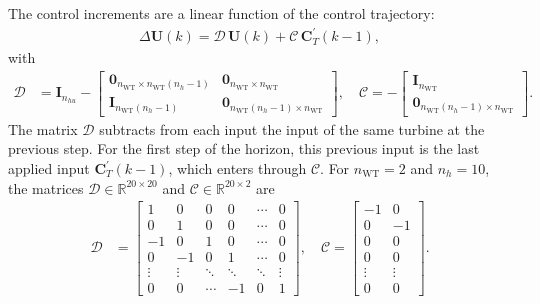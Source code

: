The control increments are a linear function of the control trajectory:
\begin{align*}
    \Delta \bm{U}(k) = \bm{\mathcal{D}}\, \bm{U}(k) + \bm{\mathcal{C}}\, \bm{C}_T^\prime(k-1),
\end{align*}
with
\begin{align*}
    \bm{\mathcal{D}} &= \bm{I}_{n_{hu}} -
    \begin{bmatrix}
        \bm{0}_{n_{\text{WT}} \times n_{\text{WT}}(n_h-1)} & \bm{0}_{n_{\text{WT}} \times n_{\text{WT}}} \\
        \bm{I}_{n_{\text{WT}}(n_h-1)} & \bm{0}_{n_{\text{WT}}(n_h-1) \times n_{\text{WT}}}
    \end{bmatrix}, \quad
    \bm{\mathcal{C}} = -\begin{bmatrix} \bm{I}_{n_{\text{WT}}} \\ \bm{0}_{n_{\text{WT}}(n_h-1) \times n_{\text{WT}}} \end{bmatrix}.
\end{align*}
The matrix $\bm{\mathcal{D}}$ subtracts from each input the input of the same turbine at the previous step. For the first step of the horizon, this previous input is the last applied input $\bm{C}_T^\prime(k-1)$, which enters through $\bm{\mathcal{C}}$. For $n_{\text{WT}} = 2$ and $n_h = 10$, the matrices $\bm{\mathcal{D}} \in \mathbb{R}^{20 \times 20}$ and $\bm{\mathcal{C}} \in \mathbb{R}^{20 \times 2}$ are
\begin{align*}
    \bm{\mathcal{D}} &= \begin{bmatrix}
        1 & 0 & 0 & 0 & \cdots & 0 \\
        0 & 1 & 0 & 0 & \cdots & 0 \\
        -1 & 0 & 1 & 0 & \cdots & 0 \\
        0 & -1 & 0 & 1 & \cdots & 0 \\
        \vdots & \vdots & \ddots & \ddots & \ddots & \vdots \\
        0 & 0 & \cdots & -1 & 0 & 1
    \end{bmatrix}, \quad
    \bm{\mathcal{C}} = \begin{bmatrix}
        -1 & 0 \\
        0 & -1 \\
        0 & 0 \\
        0 & 0 \\
        \vdots & \vdots \\
        0 & 0
    \end{bmatrix}.
\end{align*}

